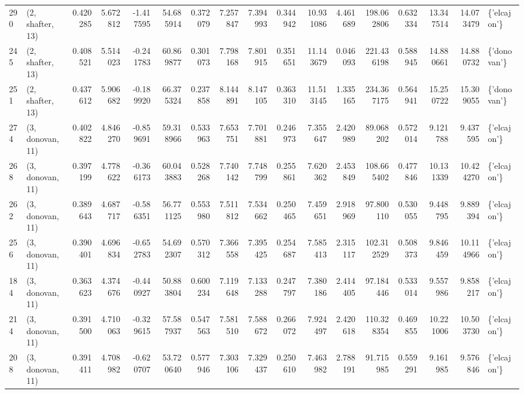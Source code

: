 \begin{tabular}{llrrrrrrrrrrrrrrl}
290 &  (2, shafter, 13) &   0.420285 &   5.672812 &  -1.417595 &    54.685914 &   0.372079 &   7.257847 &   7.394993 &  0.344942 &  10.931086 &   4.461689 &   198.062806 &   0.632334 &  13.347514 &  14.073479 &  \{'elcajon'\} \\
245 &  (2, shafter, 13) &   0.408521 &   5.514023 &  -0.241783 &    60.869877 &   0.301073 &   7.798168 &   7.801915 &  0.351651 &  11.143679 &   0.046093 &   221.436198 &   0.588945 &  14.880661 &  14.880732 &  \{'donovan'\} \\
251 &  (2, shafter, 13) &   0.437612 &   5.906682 &  -0.189920 &    66.375324 &   0.237858 &   8.144891 &   8.147105 &  0.363310 &  11.513145 &   1.335165 &   234.367175 &   0.564941 &  15.250722 &  15.309055 &  \{'donovan'\} \\
274 &  (3, donovan, 11) &   0.402822 &   4.846270 &  -0.859691 &    59.318966 &   0.533963 &   7.653751 &   7.701881 &  0.246973 &   7.355647 &   2.420989 &    89.068202 &   0.572014 &   9.121788 &   9.437595 &  \{'elcajon'\} \\
268 &  (3, donovan, 11) &   0.397199 &   4.778622 &  -0.366173 &    60.043883 &   0.528268 &   7.740142 &   7.748799 &  0.255861 &   7.620362 &   2.453849 &   108.665402 &   0.477846 &  10.131339 &  10.424270 &  \{'elcajon'\} \\
262 &  (3, donovan, 11) &   0.389643 &   4.687717 &  -0.586351 &    56.771125 &   0.553980 &   7.511812 &   7.534662 &  0.250465 &   7.459651 &   2.918969 &    97.800110 &   0.530055 &   9.448795 &   9.889394 &  \{'elcajon'\} \\
256 &  (3, donovan, 11) &   0.390401 &   4.696834 &  -0.652783 &    54.692307 &   0.570312 &   7.366558 &   7.395425 &  0.254687 &   7.585413 &   2.315117 &   102.312529 &   0.508373 &   9.846459 &  10.114966 &  \{'elcajon'\} \\
184 &  (3, donovan, 11) &   0.363623 &   4.374676 &  -0.440927 &    50.883804 &   0.600234 &   7.119648 &   7.133288 &  0.247797 &   7.380186 &   2.414405 &    97.184446 &   0.533014 &   9.557986 &   9.858217 &  \{'elcajon'\} \\
214 &  (3, donovan, 11) &   0.391500 &   4.710063 &  -0.329615 &    57.587937 &   0.547563 &   7.581510 &   7.588672 &  0.266072 &   7.924497 &   2.420618 &   110.328354 &   0.469855 &  10.221006 &  10.503730 &  \{'elcajon'\} \\
208 &  (3, donovan, 11) &   0.391411 &   4.708982 &  -0.620707 &    53.720640 &   0.577946 &   7.303106 &   7.329437 &  0.250610 &   7.463982 &   2.788191 &    91.715985 &   0.559291 &   9.161985 &   9.576846 &  \{'elcajon'\} \\

\end{tabular}
